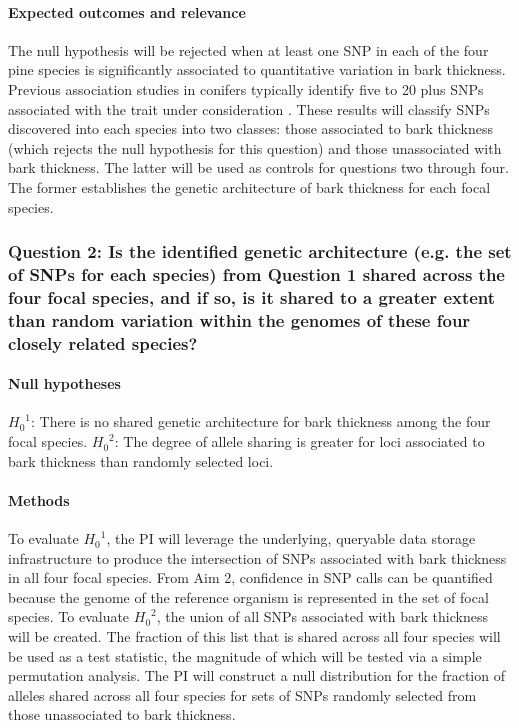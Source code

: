 \paragraph{Expected outcomes and relevance} The null hypothesis will be rejected when at least one SNP in each 
of the four pine species is significantly associated to quantitative variation in bark thickness. Previous association 
studies in conifers typically identify five to 20 plus SNPs associated with the trait under consideration 
\citet{Eckert:2012cw}. These results will classify SNPs discovered into each species into two classes: those 
associated to bark thickness (which rejects the null hypothesis for this question) and those unassociated with 
bark thickness. The latter will be used as controls for questions two through four. The former establishes the 
genetic architecture of bark thickness for each focal species.

\subsubsection*{Question 2: Is the identified genetic architecture (e.g. the set of SNPs for each species) from Question 1 
shared across the four focal species, and if so, is it shared to a greater extent than random variation within the 
genomes of these four closely related species?}

\paragraph{Null hypotheses}  ${H_{0}}^1$: There is no shared genetic architecture for bark thickness among 
the four focal species. ${H_{0}}^2$: The degree of allele sharing is greater for loci associated to 
bark thickness than randomly selected loci.

\paragraph{Methods} To evaluate ${H_{0}}^1$, the PI will leverage the underlying, queryable data storage infrastructure 
to produce the intersection of SNPs associated with bark thickness in all four focal species.  From Aim 2, confidence in SNP 
calls can be quantified because the genome of the reference organism is represented in the set of focal species.  
To evaluate ${H_{0}}^2$, the union of all SNPs associated with bark thickness 
will be created. The fraction of this list that is shared across all four species will be used as a test statistic, the magnitude 
of which will be tested via a simple permutation analysis. The PI will construct a null distribution for the fraction of alleles 
shared across all four species for sets of SNPs randomly selected from those unassociated to bark thickness. 

